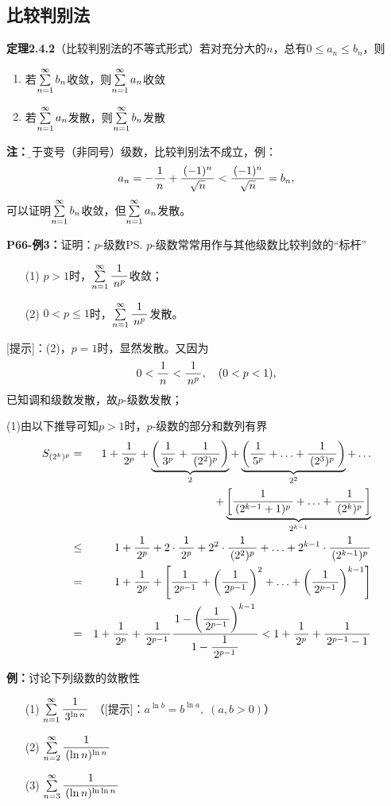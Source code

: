 \subsection{比较判别法}

{\bf 定理2.4.2}（比较判别法的不等式形式）若对充分大的$n$，总有$0\leq a_n\leq b_n$，则
\begin{enumerate}
  \setlength{\itemindent}{1cm}
  \item 若$\sumn b_n$收敛，则$\sumn a_n$收敛
  \item 若$\sumn a_n$发散，则$\sumn b_n$发散
\end{enumerate}

{\bf 注：}{\b 对于变号（非同号）级数，比较判别法不成立}，例：
$$a_n=-\df1n+\df{(-1)^n}{\sqrt n}<\df{(-1)^n}{\sqrt n}=b_n,$$
可以证明$\sumn b_n$收敛，但$\sumn a_n$发散。

{\bf P66-例3：}证明：$p$-级数\ps{$p$-级数常常用作与其他级数比较判敛的“标杆”}
\begin{enumerate}[(1)]
  \setlength{\itemindent}{1cm}
  \item[(1)] $p>1$时，$\sumn\df1{n^p}$收敛；
  \item[(2)] $0<p\leq 1$时，$\sumn\df1{n^p}$发散。
\end{enumerate}

[提示]：(2)，$p=1$时，显然发散。又因为
$$0<\df 1n<\df 1{n^p},\quad (0<p<1),$$
已知调和级数发散，故$p$-级数发散；

\begin{shaded}
(1)由以下推导可知$p>1$时，$p$-级数的部分和数列有界
\begin{eqnarray*}
	S_{(2^k)^p}&=&1+\df 1{2^p}+\underbrace{\left(\df1{3^p}+\df1{(2^2)^p}\right)}_2
				+\underbrace{\left(\df1{5^p}+\ldots+\df1{(2^3)^p}\right)}_{2^2}+\ldots\\
				&&+\underbrace{\left[\df1{(2^{k-1}+1)^p}+\ldots+\df1{(2^k)^p}\right]}_{2^{k-1}}\\
			  &\leq &1+\df 1{2^p}+2\cdot\df1{2^p}+2^2\cdot\df1{(2^2)^p}
			    +\ldots+2^{k-1}\cdot\df1{(2^{k-1})^p}\\
			  &=&1+\df 1{2^p}+\left[\df1{2^{p-1}}+\left(\df1{2^{p-1}}\right)^2+
			    \ldots+\left(\df1{2^{p-1}}\right)^{k-1}\right]\\
			  &=&1+\df 1{2^p}+\df1{2^{p-1}}\df{1-\left(\df1{2^{p-1}}\right)
			    ^{k-1}}{1-\df1{2^{p-1}}}<1+\df 1{2^p}+\df1{2^{p-1}-1}
\end{eqnarray*}
\end{shaded}


{\bf 例：}讨论下列级数的敛散性
\begin{enumerate}[(1)]
  \setlength{\itemindent}{1cm}
  \item[(1)] $\sumn\df{1}{3^{\ln n}}$
  \hfill（{[提示]：$a^{\ln b}=b^{\ln a},\;(a,b>0)$}）
  \item[(2)] $\sum\limits_{n=2}^{\infty}\df 1{(\ln n)^{\ln n}}$
  \item[(3)] $\sum\limits_{n=3}^{\infty}\df 1{(\ln n)^{\ln\ln n}}$
\end{enumerate}
	
